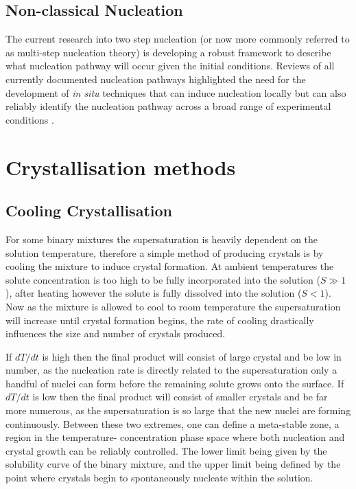 \subsection{Non-classical Nucleation} 
The current research into two step nucleation (or now more commonly 
referred to as multi-step nucleation theory) is developing a robust 
framework to describe what nucleation pathway will occur given the 
initial conditions. Reviews of all currently documented nucleation 
pathways highlighted the need for the development of \textit{in situ} 
techniques that can induce nucleation locally but can also reliably 
identify the nucleation pathway across a broad range of experimental 
conditions \cite{Karthika2016, Fu2021}. 


\section{Crystallisation methods}
\subsection{Cooling Crystallisation}
For some binary mixtures the supersaturation is heavily dependent 
on the solution temperature, therefore a simple method of producing 
crystals is by cooling the mixture to induce crystal formation. At 
ambient temperatures the solute concentration is too high to be 
fully incorporated into the solution ($S\gg 1$), after heating however 
the solute is fully dissolved into the solution ($S<1$). Now as the 
mixture is allowed to cool to room temperature the supersaturation 
will increase until crystal formation begins, the rate of cooling 
drastically influences the size and number of crystals produced.

If $dT/dt$ is high then the final product will consist of large 
crystal and be low in number, as the nucleation rate is directly 
related to the supersaturation only a handful of nuclei can form 
before the remaining solute grows onto the surface. If $dT/dt$ is 
low then the final product will consist of smaller crystals and be 
far more numerous, as the supersaturation is so large that the new 
nuclei are forming continuously. Between these two extremes, one 
can define a meta-stable zone, a region in the temperature-
concentration phase space where both nucleation and crystal growth
can be reliably controlled. The lower limit being given by the 
solubility curve of the binary mixture, and the upper limit being 
defined by the point where crystals begin to spontaneously nucleate
within the solution.

